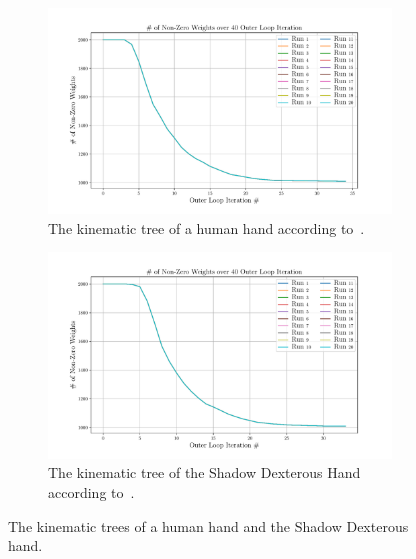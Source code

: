 \begin{figure}[!h]
	\centering
	\begin{subfigure}[b]{0.48\textwidth}
		\centering
		\includegraphics[width=\textwidth]{chapters/2-pose-estimation/fig/GNC-TLS-w-run-30-conv.pdf}
		\caption{The kinematic tree of a human hand according to~\cite{grasp-synthesis-algorithms-for-multifingered-robot-hands}.\newline}
		\label{app:GNC-TLS-w-run-30-conv}
	\end{subfigure}
	\hfill
	\begin{subfigure}[b]{0.48\textwidth}
		\centering
		\includegraphics[width=\textwidth]{chapters/2-pose-estimation/fig/GNC-TLS-w-run-40-conv.pdf}
		\caption{The kinematic tree of the Shadow Dexterous Hand according to~\cite{robot-hand-kinematics}. \newline}
		\label{app:GNC-TLS-w-run-40-conv}
	\end{subfigure}
	\caption{The kinematic trees of a human hand and the Shadow Dexterous hand.}
	\label{app:GNC-TLS-w-run-30-40-conv}
\end{figure}
